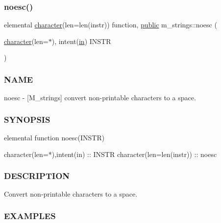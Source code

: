 \subsubsection{\texorpdfstring{noesc()}{noesc()}}
{\footnotesize\ttfamily elemental \hyperlink{option__stopwatch_83_8txt_abd4b21fbbd175834027b5224bfe97e66}{character}(len=len(instr)) function, \hyperlink{M__stopwatch_83_8txt_a2f74811300c361e53b430611a7d1769f}{public} m\+\_\+strings\+::noesc (\begin{DoxyParamCaption}\item[{\hyperlink{option__stopwatch_83_8txt_abd4b21fbbd175834027b5224bfe97e66}{character}(len=$\ast$), intent(\hyperlink{M__journal_83_8txt_afce72651d1eed785a2132bee863b2f38}{in})}]{I\+N\+S\+TR }\end{DoxyParamCaption})}



\subsubsection*{N\+A\+ME}

noesc -\/ \mbox{[}M\+\_\+strings\mbox{]} convert non-\/printable characters to a space. 

\subsubsection*{S\+Y\+N\+O\+P\+S\+IS}

\begin{DoxyVerb}elemental function noesc(INSTR)

 character(len=*),intent(in) :: INSTR
 character(len=len(instr))   :: noesc
\end{DoxyVerb}


\subsubsection*{D\+E\+S\+C\+R\+I\+P\+T\+I\+ON}

Convert non-\/printable characters to a space.

\subsubsection*{E\+X\+A\+M\+P\+L\+ES}

